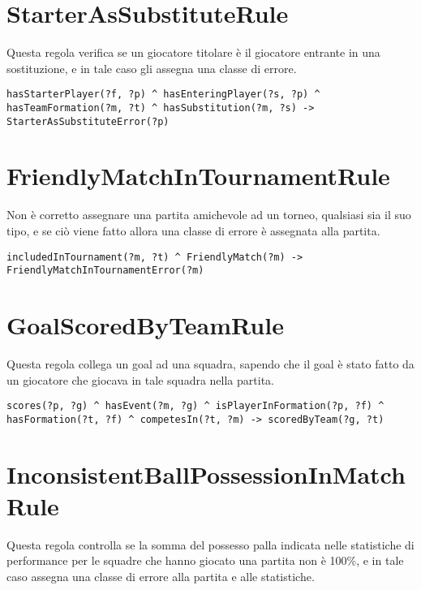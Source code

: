 \documentclass[11pt]{report} %
\begin{document}
\section{StarterAsSubstituteRule}

Questa regola verifica se un giocatore titolare è il giocatore entrante in una sostituzione, e in tale caso gli assegna una classe di errore.

\begin{lstlisting}[language=SWRL]
hasStarterPlayer(?f, ?p) ^ hasEnteringPlayer(?s, ?p) ^ hasTeamFormation(?m, ?t) ^ hasSubstitution(?m, ?s) -> StarterAsSubstituteError(?p)
\end{lstlisting}

\section{FriendlyMatchInTournamentRule}

Non è corretto assegnare una partita amichevole ad un torneo, qualsiasi sia il suo tipo, e se ciò viene fatto allora una classe di errore è assegnata alla partita. 

\begin{lstlisting}[language=SWRL]
includedInTournament(?m, ?t) ^ FriendlyMatch(?m) -> FriendlyMatchInTournamentError(?m)
\end{lstlisting}

\section{GoalScoredByTeamRule}

Questa regola collega un goal ad una squadra, sapendo che il goal è stato fatto da un giocatore che giocava in tale squadra nella partita.

\begin{lstlisting}[language=SWRL]
scores(?p, ?g) ^ hasEvent(?m, ?g) ^ isPlayerInFormation(?p, ?f) ^ hasFormation(?t, ?f) ^ competesIn(?t, ?m) -> scoredByTeam(?g, ?t)
\end{lstlisting}

\section{InconsistentBallPossessionInMatchRule}

Questa regola controlla se la somma del possesso palla indicata nelle statistiche di performance per le squadre che hanno giocato una partita non è 100\%, e in tale caso assegna una classe di errore alla partita e alle statistiche.
\end{document}
